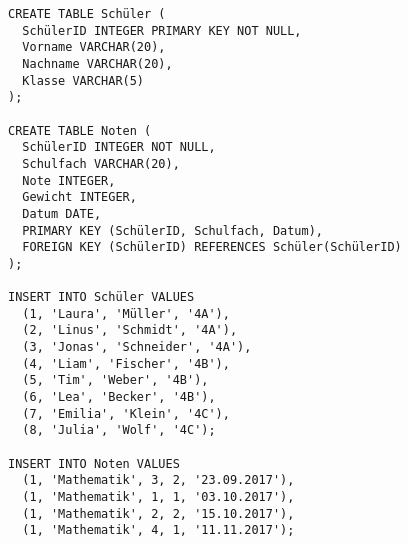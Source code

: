 \documentclass{lehramt-informatik-aufgabe}
\begin{document}
\begin{verbatim}
CREATE TABLE Schüler (
  SchülerID INTEGER PRIMARY KEY NOT NULL,
  Vorname VARCHAR(20),
  Nachname VARCHAR(20),
  Klasse VARCHAR(5)
);

CREATE TABLE Noten (
  SchülerID INTEGER NOT NULL,
  Schulfach VARCHAR(20),
  Note INTEGER,
  Gewicht INTEGER,
  Datum DATE,
  PRIMARY KEY (SchülerID, Schulfach, Datum),
  FOREIGN KEY (SchülerID) REFERENCES Schüler(SchülerID)
);

INSERT INTO Schüler VALUES
  (1, 'Laura', 'Müller', '4A'),
  (2, 'Linus', 'Schmidt', '4A'),
  (3, 'Jonas', 'Schneider', '4A'),
  (4, 'Liam', 'Fischer', '4B'),
  (5, 'Tim', 'Weber', '4B'),
  (6, 'Lea', 'Becker', '4B'),
  (7, 'Emilia', 'Klein', '4C'),
  (8, 'Julia', 'Wolf', '4C');

INSERT INTO Noten VALUES
  (1, 'Mathematik', 3, 2, '23.09.2017'),
  (1, 'Mathematik', 1, 1, '03.10.2017'),
  (1, 'Mathematik', 2, 2, '15.10.2017'),
  (1, 'Mathematik', 4, 1, '11.11.2017');
\end{verbatim}
\end{document}
